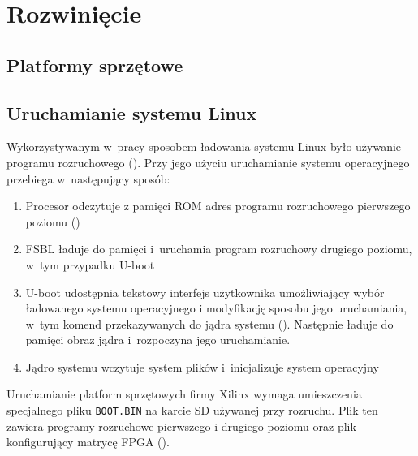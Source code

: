 \chapter{Rozwinięcie}

\section{Platformy sprzętowe} 
\label{sec:platformy_sprz_towe}





\section{Uruchamianie systemu Linux} 
\label{sec:uruchamianie_systemu_linux}

Wykorzystywanym w~pracy sposobem ładowania systemu Linux było używanie programu rozruchowego  (). Przy jego użyciu uruchamianie systemu operacyjnego przebiega w~następujący sposób\cite{krid}:
\begin{enumerate}
    \item Procesor odczytuje z pamięci ROM adres programu rozruchowego pierwszego poziomu  ()
    \item FSBL ładuje do pamięci i~uruchamia program rozruchowy drugiego poziomu, w~tym przypadku U-boot
    \item U-boot udostępnia tekstowy interfejs użytkownika umożliwiający wybór ładowanego systemu operacyjnego i modyfikację sposobu jego uruchamiania, w~tym komend przekazywanych do jądra systemu (). Następnie ładuje do pamięci obraz jądra i~rozpoczyna jego uruchamianie.
    \item Jądro systemu wczytuje system plików i~inicjalizuje system operacyjny
\end{enumerate}

Uruchamianie platform sprzętowych firmy Xilinx wymaga umieszczenia specjalnego pliku \texttt{BOOT.BIN} na karcie SD używanej przy rozruchu. Plik ten zawiera programy rozruchowe pierwszego i drugiego poziomu oraz plik konfigurujący matrycę FPGA (). 

